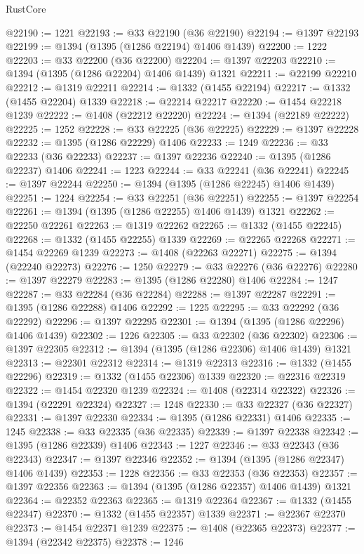 \begin{lexlean}{RustCore}
\begin{coremodule}
@22190 := 1221
@22193 := @33 @22190 (@36 @22190)
@22194 := @1397 @22193
@22199 := @1394 (@1395 (@1286 @22194) @1406 @1439)
@22200 := 1222
@22203 := @33 @22200 (@36 @22200)
@22204 := @1397 @22203
@22210 := @1394 (@1395 (@1286 @22204) @1406 @1439) @1321
@22211 := @22199 @22210
@22212 := @1319 @22211
@22214 := @1332 (@1455 @22194)
@22217 := @1332 (@1455 @22204) @1339
@22218 := @22214 @22217
@22220 := @1454 @22218 @1239
@22222 := @1408 (@22212 @22220)
@22224 := @1394 (@22189 @22222)
@22225 := 1252
@22228 := @33 @22225 (@36 @22225)
@22229 := @1397 @22228
@22232 := @1395 (@1286 @22229) @1406
@22233 := 1249
@22236 := @33 @22233 (@36 @22233)
@22237 := @1397 @22236
@22240 := @1395 (@1286 @22237) @1406
@22241 := 1223
@22244 := @33 @22241 (@36 @22241)
@22245 := @1397 @22244
@22250 := @1394 (@1395 (@1286 @22245) @1406 @1439)
@22251 := 1224
@22254 := @33 @22251 (@36 @22251)
@22255 := @1397 @22254
@22261 := @1394 (@1395 (@1286 @22255) @1406 @1439) @1321
@22262 := @22250 @22261
@22263 := @1319 @22262
@22265 := @1332 (@1455 @22245)
@22268 := @1332 (@1455 @22255) @1339
@22269 := @22265 @22268
@22271 := @1454 @22269 @1239
@22273 := @1408 (@22263 @22271)
@22275 := @1394 (@22240 @22273)
@22276 := 1250
@22279 := @33 @22276 (@36 @22276)
@22280 := @1397 @22279
@22283 := @1395 (@1286 @22280) @1406
@22284 := 1247
@22287 := @33 @22284 (@36 @22284)
@22288 := @1397 @22287
@22291 := @1395 (@1286 @22288) @1406
@22292 := 1225
@22295 := @33 @22292 (@36 @22292)
@22296 := @1397 @22295
@22301 := @1394 (@1395 (@1286 @22296) @1406 @1439)
@22302 := 1226
@22305 := @33 @22302 (@36 @22302)
@22306 := @1397 @22305
@22312 := @1394 (@1395 (@1286 @22306) @1406 @1439) @1321
@22313 := @22301 @22312
@22314 := @1319 @22313
@22316 := @1332 (@1455 @22296)
@22319 := @1332 (@1455 @22306) @1339
@22320 := @22316 @22319
@22322 := @1454 @22320 @1239
@22324 := @1408 (@22314 @22322)
@22326 := @1394 (@22291 @22324)
@22327 := 1248
@22330 := @33 @22327 (@36 @22327)
@22331 := @1397 @22330
@22334 := @1395 (@1286 @22331) @1406
@22335 := 1245
@22338 := @33 @22335 (@36 @22335)
@22339 := @1397 @22338
@22342 := @1395 (@1286 @22339) @1406
@22343 := 1227
@22346 := @33 @22343 (@36 @22343)
@22347 := @1397 @22346
@22352 := @1394 (@1395 (@1286 @22347) @1406 @1439)
@22353 := 1228
@22356 := @33 @22353 (@36 @22353)
@22357 := @1397 @22356
@22363 := @1394 (@1395 (@1286 @22357) @1406 @1439) @1321
@22364 := @22352 @22363
@22365 := @1319 @22364
@22367 := @1332 (@1455 @22347)
@22370 := @1332 (@1455 @22357) @1339
@22371 := @22367 @22370
@22373 := @1454 @22371 @1239
@22375 := @1408 (@22365 @22373)
@22377 := @1394 (@22342 @22375)
@22378 := 1246

\end{coremodule}
\end{lexlean}
